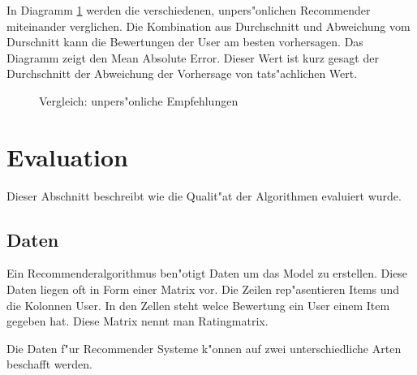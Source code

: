 \documentclass[a4paper, 12pt]{article}
\begin{document}
In Diagramm \ref{fig:maebaselines} werden die verschiedenen, unpers"onlichen Recommender miteinander verglichen. Die Kombination aus Durchschnitt und Abweichung vom Durschnitt kann die Bewertungen der User am besten vorhersagen. Das Diagramm zeigt den Mean Absolute Error. Dieser Wert ist kurz gesagt der Durchschnitt der Abweichung der Vorhersage von tats"achlichen Wert.

\begin{figure}
  \centering
{}
  
  \caption{Vergleich: unpers"onliche Empfehlungen}
  \label{fig:maebaselines}
\end{figure}

\section{Evaluation}
\label{sec:evaluation}

Dieser Abschnitt beschreibt wie die Qualit"at der Algorithmen evaluiert wurde.

\subsection{Daten}
\label{sec:data}

Ein Recommenderalgorithmus ben"otigt Daten um das Model zu erstellen. Diese Daten liegen oft in Form einer Matrix vor. Die Zeilen rep"asentieren Items und die Kolonnen User. In den Zellen steht welce Bewertung ein User einem Item gegeben hat. Diese Matrix nennt man Ratingmatrix.

Die Daten f"ur Recommender Systeme k"onnen auf zwei unterschiedliche Arten beschafft werden.
\end{document}
